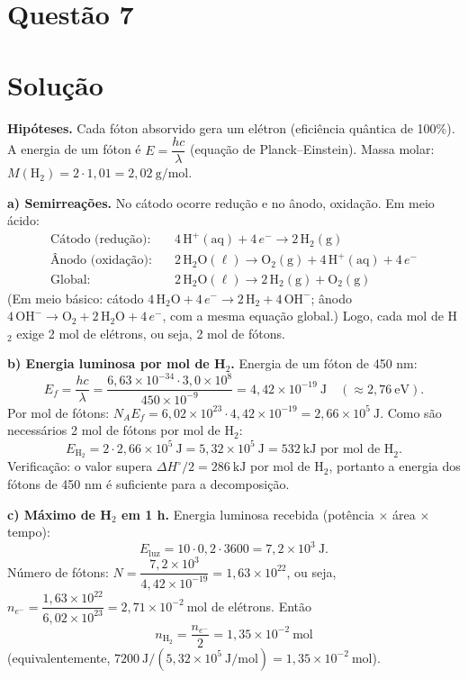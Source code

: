 \documentclass{article}%
\begin{document}
\section*{Questão 7}

\section*{Solução}

\textbf{Hipóteses.} Cada fóton absorvido gera um elétron (eficiência quântica de 100\%). A energia de um fóton é $E=\dfrac{hc}{\lambda}$ (equação de Planck--Einstein). Massa molar: $M(\text{H}_2)=2\cdot 1{,}01=2{,}02\ \text{g/mol}$.

\medskip
\textbf{a) Semirreações.} No cátodo ocorre redução e no ânodo, oxidação. Em meio ácido:
\begin{align*}
\text{Cátodo (redução):}&\quad 4\,\text{H}^+(\text{aq}) + 4\,e^- \rightarrow 2\,\text{H}_2(\text{g})\\
\text{Ânodo (oxidação):}&\quad 2\,\text{H}_2\text{O}(\ell) \rightarrow \text{O}_2(\text{g}) + 4\,\text{H}^+(\text{aq}) + 4\,e^-\\
\text{Global:}&\quad 2\,\text{H}_2\text{O}(\ell) \rightarrow 2\,\text{H}_2(\text{g}) + \text{O}_2(\text{g})
\end{align*}
(Em meio básico: cátodo $4\,\text{H}_2\text{O} + 4\,e^- \rightarrow 2\,\text{H}_2 + 4\,\text{OH}^-$; ânodo $4\,\text{OH}^- \rightarrow \text{O}_2 + 2\,\text{H}_2\text{O} + 4\,e^-$, com a mesma equação global.) Logo, cada mol de H$_2$ exige 2 mol de elétrons, ou seja, 2 mol de fótons.

\medskip
\textbf{b) Energia luminosa por mol de H$_2$.} Energia de um fóton de 450 nm:
\[
E_f=\frac{hc}{\lambda}=\frac{6{,}63\times10^{-34}\cdot 3{,}0\times10^{8}}{450\times10^{-9}}=4{,}42\times10^{-19}\ \text{J}\quad(\approx 2{,}76\ \text{eV}).
\]
Por mol de fótons: $N_A E_f = 6{,}02\times10^{23}\cdot 4{,}42\times10^{-19}=2{,}66\times10^{5}\ \text{J}$. Como são necessários 2 mol de fótons por mol de H$_2$:
\[
E_{\text{H}_2}=2\cdot 2{,}66\times10^{5}\ \text{J}=5{,}32\times10^{5}\ \text{J}=532\ \text{kJ por mol de H}_2 .
\]
Verificação: o valor supera $\Delta H^\circ/2=286\ \text{kJ}$ por mol de H$_2$, portanto a energia dos fótons de 450 nm é suficiente para a decomposição.

\medskip
\textbf{c) Máximo de H$_2$ em 1 h.} Energia luminosa recebida (potência $\times$ área $\times$ tempo):
\[
E_{\text{luz}}=10\cdot 0{,}2\cdot 3600=7{,}2\times10^{3}\ \text{J}.
\]
Número de fótons: $N=\dfrac{7{,}2\times10^{3}}{4{,}42\times10^{-19}}=1{,}63\times10^{22}$, ou seja, $n_{e^-}=\dfrac{1{,}63\times10^{22}}{6{,}02\times10^{23}}=2{,}71\times10^{-2}\ \text{mol}$ de elétrons. Então
\[
n_{\text{H}_2}=\frac{n_{e^-}}{2}=1{,}35\times10^{-2}\ \text{mol}
\]
(equivalentemente, $7200\ \text{J}/(5{,}32\times10^{5}\ \text{J/mol})=1{,}35\times10^{-2}\ \text{mol}$).
\end{document}
